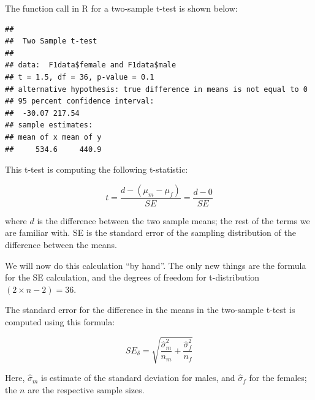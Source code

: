 \documentclass[12pt,]{krantz}
\newenvironment{Shaded}{\begin{snugshade}}{\end{snugshade}}
\newcommand{\CommentTok}[1]{\textcolor[rgb]{0.56,0.35,0.01}{\textit{#1}}}
\newcommand{\DataTypeTok}[1]{\textcolor[rgb]{0.13,0.29,0.53}{#1}}
\newcommand{\DecValTok}[1]{\textcolor[rgb]{0.00,0.00,0.81}{#1}}
\newcommand{\KeywordTok}[1]{\textcolor[rgb]{0.13,0.29,0.53}{\textbf{#1}}}
\newcommand{\NormalTok}[1]{#1}
\newcommand{\OperatorTok}[1]{\textcolor[rgb]{0.81,0.36,0.00}{\textbf{#1}}}
\newcommand{\OtherTok}[1]{\textcolor[rgb]{0.56,0.35,0.01}{#1}}
\newcommand{\StringTok}[1]{\textcolor[rgb]{0.31,0.60,0.02}{#1}}
\begin{document}
The function call in R for a two-sample t-test is shown below:

\begin{Shaded}
\end{Shaded}

\begin{verbatim}
## 
## 	Two Sample t-test
## 
## data:  F1data$female and F1data$male
## t = 1.5, df = 36, p-value = 0.1
## alternative hypothesis: true difference in means is not equal to 0
## 95 percent confidence interval:
##  -30.07 217.54
## sample estimates:
## mean of x mean of y 
##     534.6     440.9
\end{verbatim}

This t-test is computing the following t-statistic:

\begin{equation}
t=\frac{d-(\mu_m - \mu_f)}{SE} = \frac{d-0}{SE} 
\end{equation}

\noindent 
where \(d\) is the difference between the two sample means; the rest of the terms we are familiar with. SE is the standard error of the sampling distribution of the difference between the means.

We will now do this calculation ``by hand''. The only new things are the formula for the SE calculation, and the degrees of freedom for t-distribution \((2\times n - 2)=36\).

The standard error for the difference in the means in the two-sample t-test is computed using this formula:

\begin{equation}
SE_\delta 
= \sqrt{\frac{\hat\sigma_m^2}{n_m} + \frac{\hat\sigma_f^2}{n_f}}
\end{equation}

Here, \(\hat\sigma_m\) is estimate of the standard deviation for males, and \(\hat\sigma_f\) for the females; the \(n\) are the respective sample sizes.

\begin{Shaded}
\end{Shaded}
\end{document}
